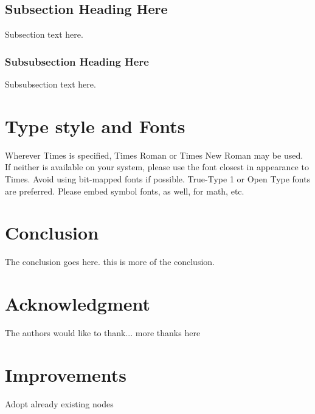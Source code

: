 \documentclass[10pt, conference, compsocconf,a4paper]{IEEEtran}
\begin{document}
\subsection{Subsection Heading Here}
Subsection text here.

\subsubsection{Subsubsection Heading Here}
Subsubsection text here.

\section{Type style and Fonts}
Wherever Times is specified, Times Roman or Times New Roman may be used. If neither is available on your system, please use the font closest in appearance to Times. Avoid using bit-mapped fonts if possible. True-Type 1 or Open Type fonts are preferred. Please embed symbol fonts, as well, for math, etc.

\section{Conclusion}
The conclusion goes here. this is more of the conclusion.


\section*{Acknowledgment}

The authors would like to thank...
more thanks here


\section{Improvements} %
\label{sec:improvements}
Adopt already existing nodes



\end{document}
